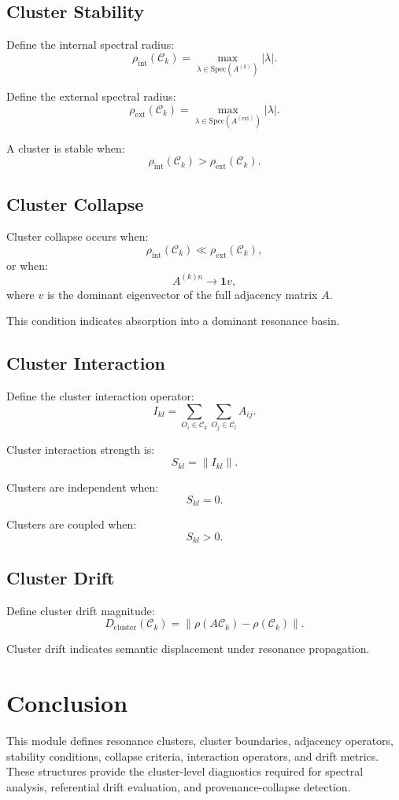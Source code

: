 \subsection{Cluster Stability}

Define the internal spectral radius:
\[
\rho_{\mathrm{int}}(\mathcal{C}_k)
  = \max_{\lambda \in \mathrm{Spec}(A^{(k)})} |\lambda|.
\]

Define the external spectral radius:
\[
\rho_{\mathrm{ext}}(\mathcal{C}_k)
  = \max_{\lambda \in \mathrm{Spec}(A^{(\mathrm{ext})})} |\lambda|.
\]

A cluster is stable when:
\[
\rho_{\mathrm{int}}(\mathcal{C}_k) > \rho_{\mathrm{ext}}(\mathcal{C}_k).
\]

\subsection{Cluster Collapse}

Cluster collapse occurs when:
\[
\rho_{\mathrm{int}}(\mathcal{C}_k) \ll \rho_{\mathrm{ext}}(\mathcal{C}_k),
\]
or when:
\[
A^{(k)n} \to \mathbf{1} v,
\]
where $v$ is the dominant eigenvector of the full adjacency matrix $A$.

This condition indicates absorption into a dominant resonance basin.

\subsection{Cluster Interaction}

Define the cluster interaction operator:
\[
I_{kl} = \sum_{O_i \in \mathcal{C}_k}
          \sum_{O_j \in \mathcal{C}_l}
          A_{ij}.
\]

Cluster interaction strength is:
\[
S_{kl} = \| I_{kl} \|.
\]

Clusters are independent when:
\[
S_{kl} = 0.
\]

Clusters are coupled when:
\[
S_{kl} > 0.
\]

\subsection{Cluster Drift}

Define cluster drift magnitude:
\[
D_{\mathrm{cluster}}(\mathcal{C}_k)
  = \left\| \rho(A \mathcal{C}_k) - \rho(\mathcal{C}_k) \right\|.
\]

Cluster drift indicates semantic displacement under resonance propagation.

\section{Conclusion}

This module defines resonance clusters, cluster boundaries, adjacency
operators, stability conditions, collapse criteria, interaction operators,
and drift metrics. These structures provide the cluster-level diagnostics
required for spectral analysis, referential drift evaluation, and
provenance-collapse detection.
